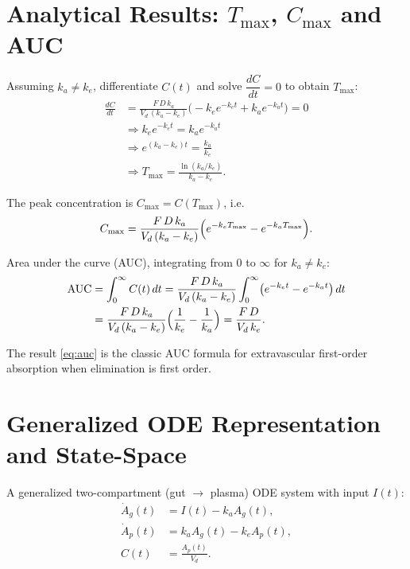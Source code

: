 \documentclass[10pt,a4paper]{article}
\begin{document}
\section{Analytical Results: $T_{\max}$, $C_{\max}$ and AUC}

Assuming $k_a \neq k_e$, differentiate $C(t)$ and solve $\dfrac{dC}{dt} = 0$ to obtain $T_{\max}$:
\begin{align}
\frac{dC}{dt} &= \frac{F \, D \, k_a}{V_d \, (k_a - k_e)} \bigl(-k_e e^{-k_e t} + k_a e^{-k_a t}\bigr) = 0 \nonumber \\
&\Longrightarrow k_e e^{-k_e t} = k_a e^{-k_a t} \nonumber \\
&\Longrightarrow e^{(k_a - k_e)t} = \frac{k_a}{k_e} \nonumber \\
&\Longrightarrow T_{\max} = \frac{\ln(k_a/k_e)}{k_a - k_e}.
\label{eq:tmax}
\end{align}

The peak concentration is $C_{\max} = C(T_{\max})$, i.e.
\begin{equation}
C_{\max} = \frac{F \, D \, k_a}{V_d \, (k_a - k_e)} \Bigl(e^{-k_e T_{\max}} - e^{-k_a T_{\max}}\Bigr).
\label{eq:cmax}
\end{equation}

Area under the curve (AUC), integrating from $0$ to $\infty$ for $k_a \neq k_e$:
\begin{align}
\text{AUC} &= \int_0^\infty C(t) \, dt = \frac{F \, D \, k_a}{V_d \, (k_a - k_e)} \int_0^\infty \bigl(e^{-k_e t} - e^{-k_a t}\bigr) \, dt \nonumber \\
&= \frac{F \, D \, k_a}{V_d \, (k_a - k_e)} \Bigl(\frac{1}{k_e} - \frac{1}{k_a}\Bigr) = \frac{F \, D}{V_d \, k_e}.
\label{eq:auc}
\end{align}

The result \eqref{eq:auc} is the classic AUC formula for extravascular first-order absorption when elimination is first order.

\section{Generalized ODE Representation and State-Space}

A generalized two-compartment (gut $\to$ plasma) ODE system with input $I(t)$:
\begin{align}
\dot{A}_g(t) &= I(t) - k_a A_g(t), \label{eq:ag} \\
\dot{A}_p(t) &= k_a A_g(t) - k_e A_p(t), \label{eq:ap} \\
C(t) &= \frac{A_p(t)}{V_d}. \label{eq:c}
\end{align}
\end{document}
